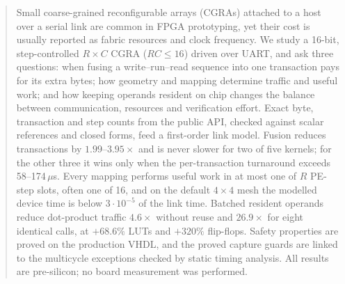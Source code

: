 {}
\begin{abstract}
Small coarse-grained reconfigurable arrays (CGRAs) attached to a host over a
serial link are common in FPGA prototyping, yet their cost is usually
reported as fabric resources and clock frequency. We study a 16-bit,
step-controlled $R\times C$ CGRA ($RC\le16$) driven over UART, and ask three
questions: when fusing a write--run--read sequence into one transaction
pays for its extra bytes; how geometry and mapping determine traffic and
useful work; and how keeping operands resident on chip changes the balance
between communication, resources and verification effort. Exact byte,
transaction and step counts from the public API, checked against scalar
references and closed forms, feed a first-order link model. Fusion reduces
transactions by $1.99$--$3.95\times$ and is never slower for two of five
kernels; for the other three it wins only when the per-transaction
turnaround exceeds 58--174\,$\mu$s. Every mapping performs useful work in at
most one of $R$ PE-step slots, often one of 16, and on the default
$4\times4$ mesh the modelled device time is below $3\cdot10^{-5}$ of the
link time. Batched resident operands
reduce dot-product traffic $4.6\times$ without reuse and $26.9\times$ for
eight identical calls, at $+68.6\%$ LUTs and $+320\%$ flip-flops. Safety
properties are proved on the production VHDL, and the proved capture guards
are linked to the multicycle exceptions checked by static timing analysis.
All results are pre-silicon; no board measurement was performed.
\end{abstract}
